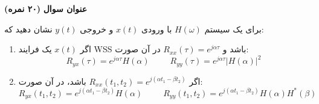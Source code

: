 \Large \textbf{عنوان سوال}
\large \textbf{(۲۰ نمره)}

\normalsize \vspace{0.5cm}
برای یک سیستم
$H\left( \omega  \right)$
با ورودی
$x\left( t \right)$
و خروجی
$y\left( t \right)$
نشان دهید که:

\begin{enumerate}[label=(\alph*)]
	\item
	اگر
	$x\left( t \right)$
	یک فرایند WSS باشد و
	${R_{xx}}\left( \tau  \right) = {e^{j\alpha \tau }}$
	در آن صورت:
	$$
	{R_{yx}}\left( \tau  \right) = {e^{j\alpha \tau }}H\left( \alpha  \right)\:\:\:\:\:\:\:\:\:\:\:{R_{yy}}\left( \tau  \right) = {e^{j\alpha \tau }}{\left| {H\left( \alpha  \right)} \right|^2}
	$$
	\item 
	اگر
	${R_{xx}}\left( {{t_1},{t_2}} \right) = {e^{j\left( {\alpha {t_1} - \beta {t_2}} \right)}}$
	باشد، در آن صورت:
	$$
	{R_{yx}}\left( {{t_1},{t_2}} \right) = {e^{j\left( {\alpha {t_1} - \beta {t_2}} \right)}}H\left( \alpha  \right)\:\:\:\:\:\:\:\:\:\:\:{R_{yy}}\left( {{t_1},{t_2}} \right) = {e^{j\left( {\alpha {t_1} - \beta {t_2}} \right)}}H\left( \alpha  \right){H^*}\left( \beta  \right)
	$$
\end{enumerate}


